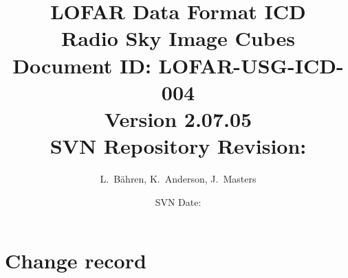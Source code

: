 \documentclass[a4paper,10pt,bibtotoc]{scrartcl}
\begin{document}

\title{LOFAR Data Format ICD \\ Radio Sky Image Cubes \\
{\normalsize Document ID: LOFAR-USG-ICD-004} \\
{\normalsize Version 2.07.05} \\
{\normalsize SVN Repository Revision: \svnInfoRevision}}
\author{L.~B\"ahren, K.~Anderson, J.~Masters}
\date{\small{SVN Date: \svnInfoDate}}
\maketitle

\tableofcontents

\clearpage


\section*{Change record}
\end{document}
